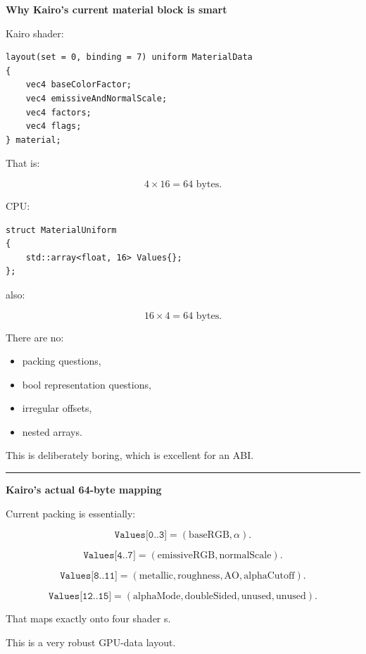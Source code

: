 \textbf{Why Kairo's current material block is smart}

Kairo shader:

\begin{verbatim}
layout(set = 0, binding = 7) uniform MaterialData
{
    vec4 baseColorFactor;
    vec4 emissiveAndNormalScale;
    vec4 factors;
    vec4 flags;
} material;
\end{verbatim}

That is:

\[
4\times16=64\text{ bytes}.
\]

CPU:

\begin{verbatim}
struct MaterialUniform
{
    std::array<float, 16> Values{};
};
\end{verbatim}

also:

\[
16\times4=64\text{ bytes}.
\]

There are no:

\begin{itemize}
\tightlist
\item
   packing questions,
\item
  bool representation questions,
\item
  irregular offsets,
\item
  nested arrays.
\end{itemize}

This is deliberately boring, which is excellent for an ABI.

\begin{center}\rule{0.5\linewidth}{0.5pt}\end{center}

\textbf{Kairo's actual 64-byte mapping}

Current packing is essentially:

\[
\texttt{Values[0..3]}
=
(\text{baseRGB},\alpha).
\]

\[
\texttt{Values[4..7]}
=
(\text{emissiveRGB},\text{normalScale}).
\]

\[
\texttt{Values[8..11]}
=
(\text{metallic},
\text{roughness},
\text{AO},
\text{alphaCutoff}).
\]

\[
\texttt{Values[12..15]}
=
(\text{alphaMode},
\text{doubleSided},
\text{unused},\text{unused}).
\]

That maps exactly onto four shader s.

This is a very robust GPU-data layout.

